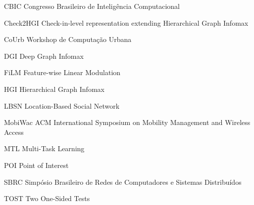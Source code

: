     \listoffigures*
    \cleardoublepage

    \listoftables*
    \cleardoublepage

    \begin{siglas}
        \item[CBIC] Congresso Brasileiro de Intelig\^encia Computacional
        \item[Check2HGI] Check-in-level representation extending Hierarchical Graph Infomax
        \item[CoUrb] Workshop de Computa\c{c}\~ao Urbana
        \item[DGI] Deep Graph Infomax
        \item[FiLM] Feature-wise Linear Modulation
        \item[HGI] Hierarchical Graph Infomax
        \item[LBSN] Location-Based Social Network
        \item[MobiWac] ACM International Symposium on Mobility Management and Wireless Access
        \item[MTL] Multi-Task Learning
        \item[POI] Point of Interest
        \item[SBRC] Simp\'osio Brasileiro de Redes de Computadores e Sistemas Distribu\'idos
        \item[TOST] Two One-Sided Tests
    \end{siglas}
    \cleardoublepage

    \tableofcontents*
    \cleardoublepage

    \textual
    \ifdefensebuild\else
    \pagestyle{abntheadings}
    \setcounter{page}{\finalbuildfirstpage}
    \fi

